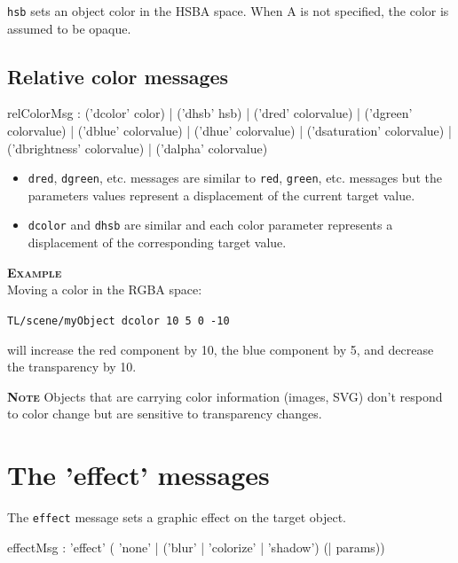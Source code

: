\documentclass[a4paper,twoside]{report}
\newcommand{\sublevel}[1]	{\section{#1}}
\newcommand{\subsublevel}[1]	{\subsection{#1}}
\newcommand{\OSC}[1]		{\texttt{#1}}
\newcommand{\example}		{\textbf{\hspace{-1.5cm}\textbf{\textsc{Example }}}}
\newcommand{\note}	[1]		{\vspace{2mm}\textbf{\hspace{-1.03cm}\textbf{\textsc{Note #1}}}}
\newcommand{\sample}	[1]			{\vspace{-2mm}\begin{center}\colorbox{mygrey}{
								\begin{minipage}[t]{0.9\columnwidth} 
								{\small \texttt{#1}}
								\end{minipage}}\end{center}}
\newcommand{\sampleindent}	{ \hspace{0.5cm} }
\begin{document}
\OSC{hsb} sets an object color in the HSBA space. 
When A is not specified, the color is assumed to be opaque. 



\subsublevel{Relative color messages}
\label{relcolormsg}

\begin{rail}
relColorMsg :  
		 	('dcolor' color) 
		| 	('dhsb' hsb) 
		| 	('dred' colorvalue) 
		| 	('dgreen' colorvalue) 
		| 	('dblue' colorvalue) 
		| 	('dhue' colorvalue) 
		| 	('dsaturation' colorvalue) 
		| 	('dbrightness' colorvalue) 
		| 	('dalpha' colorvalue) 
\end{rail}

\begin{itemize}
\item \OSC{dred}, \OSC{dgreen}, etc. messages are similar to \OSC{red}, \OSC{green}, etc. messages but the parameters values represent a displacement of the current target value.
\item \OSC{dcolor} and \OSC{dhsb} are similar and each color parameter represents a displacement of the corresponding target value.
\end{itemize}

\example \\
Moving a color in the RGBA space:
\sample{TL/scene/myObject dcolor 10 5 0 -10}
\sampleindent will increase the red component by 10, the blue component by 5, and decrease the transparency by 10.

\note{} Objects that are carrying color information (images, SVG) don't respond to color change but are sensitive to transparency changes.


\sublevel{The 'effect' messages}
\label{effectmsg}

The \OSC{effect} message sets a graphic effect on the target object.

\begin{rail}
effectMsg : 'effect' ( 'none'
		| ('blur'
		| 'colorize'
		| 'shadow') (| params)) 		
\end{rail}
\end{document}
